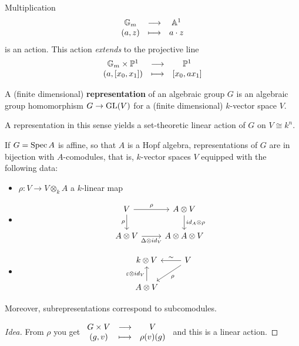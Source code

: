 \begin{example}
Multiplication 
\[\begin{array}{ccc} {\mathbb{G}_m} & \longrightarrow & {\mathbb{A}^1}\\ {(a,z)} & \longmapsto & {a\cdot z} \end{array}\] 
is an action. This action \textit{extends} to the projective line
\[\begin{array}{ccc} {\mathbb{G}_m\times \mathbb{P}^1} & \longrightarrow & {\mathbb{P}^1}\\ {(a,[x_0,x_1])} & \longmapsto & {[x_0,ax_1]} \end{array}\]
\end{example}



\begin{definition}
A (finite dimensional) \textbf{representation} of an algebraic group $G$ is an algebraic group homomorphism $G\to \mathrm{GL}(V)$ for a (finite dimensional) $k$-vector space $V$.
\end{definition}


\begin{remark}
A representation in this sense yields a set-theoretic linear action of $G$ on $V\cong k^n$.
\end{remark}

\begin{fact}
If $G=\operatorname{Spec} A$ is affine, so that $A$ is a Hopf algebra, representations of $G$ are in bijection with $A$-comodules, that is, $k$-vector spaces $V$ equipped with the following data:
\begin{itemize}
\item $\rho:V\to V\otimes_k A$ a $k$-linear map
\item  
\[\begin{tikzcd}
	V & {A\otimes V} \\
	{A\otimes V} & {A\otimes A\otimes V}
	\arrow["\rho", from=1-1, to=1-2]
	\arrow["\rho"', from=1-1, to=2-1]
	\arrow["{id_A\otimes \rho}", from=1-2, to=2-2]
	\arrow["{\Delta\otimes id_V}"', from=2-1, to=2-2]
\end{tikzcd}\]
\item 
\[\begin{tikzcd}
	{k\otimes V} & V \\
	{A\otimes V}
	\arrow["\sim"', from=1-2, to=1-1]
	\arrow["\rho", from=1-2, to=2-1]
	\arrow["{\e\otimes id_V}", from=2-1, to=1-1]
\end{tikzcd}\]
\end{itemize}
Moreover, subrepresentations correspond to subcomodules.
\end{fact}
\begin{proof}[Idea]
From $\rho$ you get $\begin{array}{ccc} {G\times V} & \longrightarrow & {V}\\ {(g,v)} & \longmapsto & {\rho(v)(g)} \end{array}$ and this is a linear action.
\end{proof}


